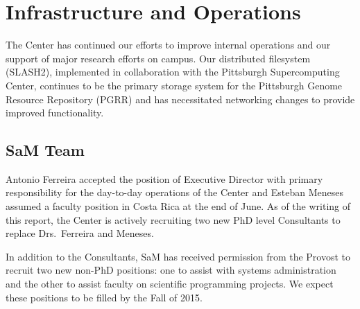 \chapter{Infrastructure and Operations}
The Center has continued our efforts to improve internal operations and our
support of major research efforts on campus.  Our distributed filesystem (SLASH2),
implemented in collaboration with the Pittsburgh Supercomputing Center, continues
to be the primary storage system for the Pittsburgh Genome Resource Repository
(PGRR) and has necessitated networking changes to provide improved
functionality.
\section{SaM Team}
Antonio
Ferreira accepted the position of Executive Director with primary
responsibility for the day-to-day operations of the Center and Esteban Meneses
assumed a faculty position in Costa Rica at the end of June.  As of the writing of this report,
the Center is actively recruiting two new PhD level Consultants to replace Drs.\
Ferreira and Meneses.

In addition to the Consultants, SaM has received permission from the Provost
to recruit two new non-PhD positions: one to assist with systems
administration and the other to assist faculty on scientific programming projects.  We expect these positions to be
filled by the Fall of 2015.

